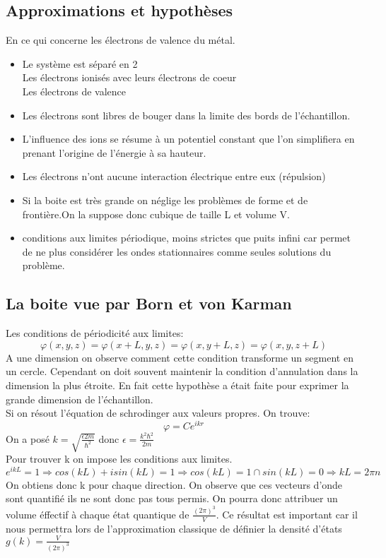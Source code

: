 \subsection{Approximations et hypothèses}

En ce qui concerne les électrons de valence du métal.

\begin{itemize}[label=]
\item Le système est séparé en 2 \\
Les électrons ionisés avec leurs électrons de coeur \\
Les électrons de valence
\item Les électrons sont libres de bouger dans la limite des bords de l'échantillon.
\item L'influence des ions se résume à un potentiel constant que l'on simplifiera en prenant l'origine de l'énergie à sa hauteur.
\item Les électrons n'ont aucune interaction électrique entre eux (répulsion)
\item Si la boite est très grande on néglige les problèmes de forme et de frontière.On la suppose donc cubique de taille L et volume V.
\item conditions aux limites périodique, moins strictes que puits infini car permet de ne plus considérer les ondes stationnaires comme seules solutions du problème.
\end{itemize}

\subsection{La boite vue par Born et von Karman}

Les conditions de périodicité aux limites:
$$\varphi(x,y,z)=\varphi(x+L,y,z)=\varphi(x,y+L,z)=\varphi(x,y,z+L)$$
A une dimension on observe comment cette condition transforme un segment en un cercle. Cependant on doit souvent maintenir la condition d'annulation dans la dimension la plus étroite. En fait cette hypothèse a était faite pour exprimer la grande dimension de l'échantillon.\\
Si on résout l'équation de schrodinger aux valeurs propres. On trouve:
$$\varphi =Ce^{ikr}$$
On a posé $k=\sqrt{\frac{\epsilon 2m}{\hbar^2}}$ donc $\epsilon=\frac{k^2\hbar^2}{2m}$ \\
Pour trouver k on impose les conditions aux limites.
$$e^{ikL}=1 \Rightarrow cos(kL)+isin(kL)=1 \Rightarrow cos(kL)=1\cap sin(kL)=0 \Rightarrow kL=2\pi n$$
On obtiens donc k pour chaque direction. On observe que ces vecteurs d'onde sont quantifié ils ne sont donc pas tous permis. On pourra donc attribuer un volume éffectif à chaque état quantique de $\frac{(2\pi)^3}{V}$. Ce résultat est important car il nous permettra lors de l'approximation classique de définier la densité d'états $g(k)=\frac{V}{(2\pi)^3}$

